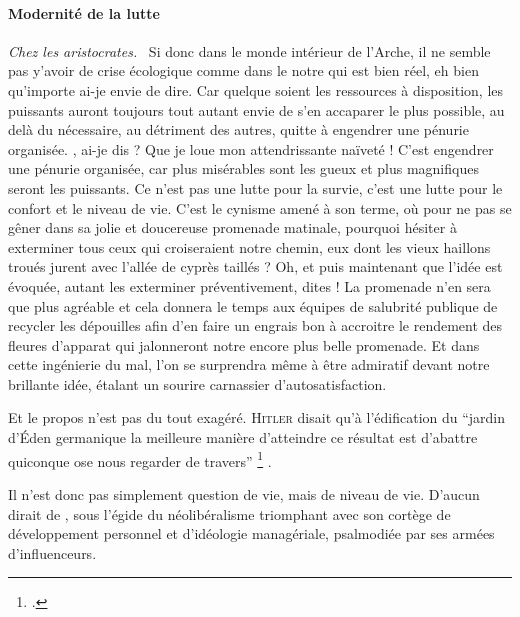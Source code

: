 \paragraph{Modernité de la lutte}
{\em\normalsize Chez les aristocrates.}~
Si donc dans le monde intérieur de l’Arche, il ne semble pas y’avoir de crise écologique comme dans le notre qui est bien réel, eh bien qu’importe ai-je envie de dire. Car quelque soient les ressources à disposition, les puissants auront toujours tout autant envie de s’en accaparer le plus possible, au delà du nécessaire, au détriment des autres, quitte à engendrer une pénurie organisée. , ai-je dis ? Que je loue mon attendrissante naïveté ! C’est  engendrer une pénurie organisée, car plus misérables sont les gueux et plus magnifiques seront les puissants.
Ce n’est pas une lutte pour la survie, c’est une lutte pour le confort et le niveau de vie. %
C’est le cynisme amené à son terme, où pour ne pas se gêner dans sa jolie et doucereuse promenade matinale, pourquoi hésiter à exterminer tous ceux qui croiseraient notre chemin, eux dont les vieux haillons troués jurent avec l’allée de cyprès taillés ? Oh, et puis maintenant que l’idée est évoquée, autant les exterminer préventivement, dites ! La promenade n’en sera que plus agréable et cela donnera le temps aux équipes de salubrité publique de recycler les dépouilles afin d’en faire un engrais bon à accroitre le rendement des fleures d’apparat qui jalonneront notre encore plus belle promenade. Et dans cette ingénierie du mal, l’on se surprendra même à être admiratif devant notre brillante idée, étalant un sourire carnassier d’autosatisfaction.

Et le propos n’est pas du tout exagéré. \textsc{Hitler} disait qu’à l’édification du \enquote{jardin d’Éden germanique \textelp{} la meilleure manière d’atteindre ce résultat est d’abattre quiconque ose nous regarder de travers}%
\footcite[La citation est tirée des notes de \textsc{Bormann}, présentées en tant que preuve lors du procès de Nuremberg.][]{chirstopherBrowning2022BellesLettres-politiqueNazieTravailleursJuifsBourreauxAllemands}%
.

Il n’est donc pas simplement question de vie, mais de niveau de vie. D’aucun dirait de , sous l’égide du néolibéralisme triomphant avec son cortège de développement personnel et d’idéologie managériale, psalmodiée par ses armées d’influenceurs.

